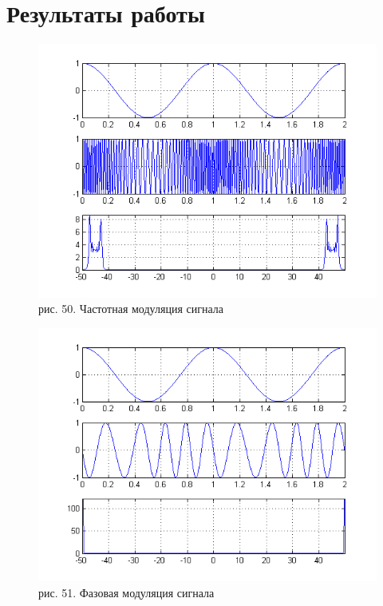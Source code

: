 \documentclass[10pt,a4paper]{report}
\begin{document}
\section{Результаты работы}
\begin{figure}
\begin{center}
\includegraphics[width=150mm, scale = 0.9]{8_1}\newline
рис. 50. Частотная модуляция сигнала\newline
\end{center}
\end{figure}
\begin{figure}
\begin{center}
\includegraphics[width=150mm, scale = 0.9]{8_2}\newline
рис. 51. Фазовая модуляция сигнала\newline
\end{center}
\end{figure}
\end{document}
